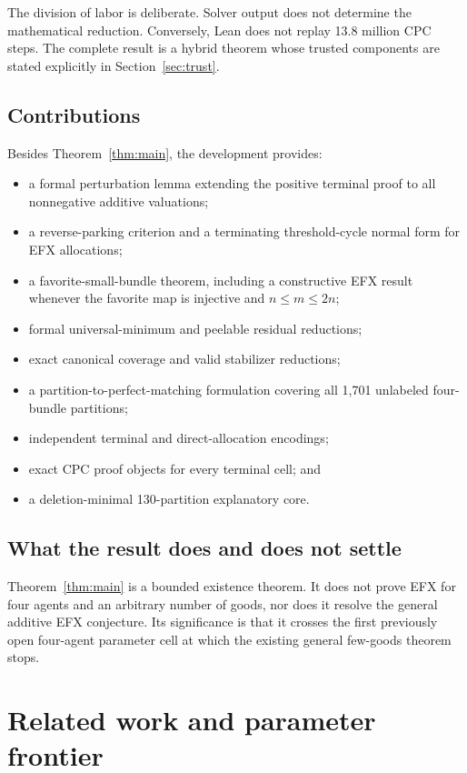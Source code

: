 \documentclass[11pt]{article}
\theoremstyle{definition}
\begin{document}
The division of labor is deliberate. Solver output does not determine the
mathematical reduction. Conversely, Lean does not replay 13.8 million CPC
steps. The complete result is a hybrid theorem whose trusted components are
stated explicitly in Section~\ref{sec:trust}.

\subsection{Contributions}

Besides Theorem~\ref{thm:main}, the development provides:
\begin{itemize}[leftmargin=1.8em]
  \item a formal perturbation lemma extending the positive terminal proof to
  all nonnegative additive valuations;
  \item a reverse-parking criterion and a terminating threshold-cycle normal
  form for EFX allocations;
  \item a favorite-small-bundle theorem, including a constructive EFX result
  whenever the favorite map is injective and $n\le m\le2n$;
  \item formal universal-minimum and peelable residual reductions;
  \item exact canonical coverage and valid stabilizer reductions;
  \item a partition-to-perfect-matching formulation covering all 1,701
  unlabeled four-bundle partitions;
  \item independent terminal and direct-allocation encodings;
  \item exact CPC proof objects for every terminal cell; and
  \item a deletion-minimal 130-partition explanatory core.
\end{itemize}

\subsection{What the result does and does not settle}

Theorem~\ref{thm:main} is a bounded existence theorem. It does not prove EFX
for four agents and an arbitrary number of goods, nor does it resolve the
general additive EFX conjecture. Its significance is that it crosses the
first previously open four-agent parameter cell at which the existing
general few-goods theorem stops.

\section{Related work and parameter frontier}\label{sec:related}
\end{document}

